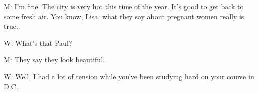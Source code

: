 \documentclass[12pt]{article}
\begin{document}
M: I'm fine. The city is very hot this time of the year. It's good to get back to some fresh air. You know, Lisa, what they say about pregnant women really is true.
\vspace{0.00mm}

\vspace{0.00mm}
\setlength{\parindent}{0.00mm}
\setlength{\leftskip}{-6.23mm}
\setlength{\rightskip}{0.00mm}


\vspace{0.00mm}

\vspace{0.00mm}
\setlength{\parindent}{0.00mm}
\setlength{\leftskip}{-6.23mm}
\setlength{\rightskip}{0.00mm}

W: What's that Paul?
\vspace{0.00mm}

\vspace{0.00mm}
\setlength{\parindent}{0.00mm}
\setlength{\leftskip}{-6.23mm}
\setlength{\rightskip}{0.00mm}


\vspace{0.00mm}

\vspace{0.00mm}
\setlength{\parindent}{0.00mm}
\setlength{\leftskip}{-6.23mm}
\setlength{\rightskip}{0.00mm}

M: They say they look beautiful.
\vspace{0.00mm}

\vspace{0.00mm}
\setlength{\parindent}{0.00mm}
\setlength{\leftskip}{-6.23mm}
\setlength{\rightskip}{0.00mm}


\vspace{0.00mm}

\vspace{0.00mm}
\setlength{\parindent}{0.00mm}
\setlength{\leftskip}{-6.23mm}
\setlength{\rightskip}{0.00mm}

W: Well, I had a lot of tension while you've been studying hard on your course in D.C.
\vspace{0.00mm}

\vspace{0.00mm}
\setlength{\parindent}{0.00mm}
\setlength{\leftskip}{-6.23mm}
\setlength{\rightskip}{0.00mm}


\vspace{0.00mm}

\vspace{0.00mm}
\setlength{\parindent}{0.00mm}
\setlength{\leftskip}{-6.23mm}
\setlength{\rightskip}{0.00mm}
\end{document}

